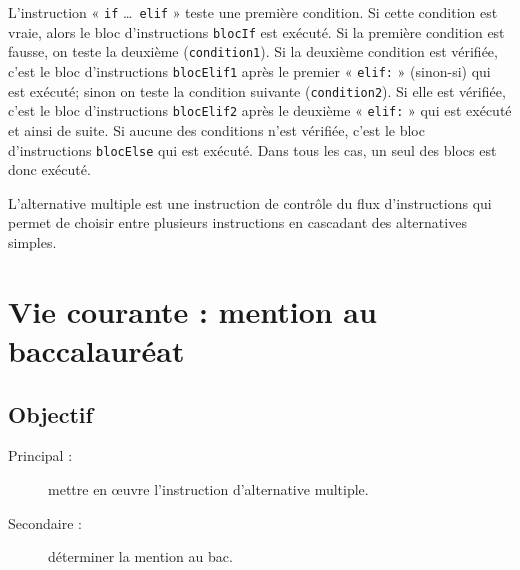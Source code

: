 L'instruction « {\tt if} \ldots\ {\tt elif} » teste une première condition. 
Si cette condition est vraie, alors le bloc d'instructions {\tt blocIf} 
est exécuté. Si la première condition est fausse, on teste la deuxième ({\tt condition1}).
Si la deuxième condition est vérifiée, c'est le bloc d'instructions {\tt blocElif1} après le premier « {\tt elif:} » 
(sinon-si) qui est exécuté; sinon on teste la condition suivante ({\tt condition2}).
Si elle est vérifiée, c'est le bloc d'instructions {\tt blocElif2} après le deuxième « {\tt elif:} » 
qui est exécuté et ainsi de suite. Si aucune des conditions n'est vérifiée, c'est le bloc d'instructions
{\tt blocElse} qui est exécuté. Dans tous les cas, un seul des blocs est donc exécuté.

\begin{definition}
L'alternative multiple est une instruction de contrôle du flux d'instructions 
qui permet de choisir entre plusieurs instructions en cascadant des alternatives simples.
\end{definition}

\section{Vie courante : mention au baccalauréat}\label{tests:vie-courante}

\subsection{Objectif}\label{tests:vie-courante:objectif}
\begin{description}
\item[Principal : ] mettre en \oe uvre l'instruction d'alternative multiple.
\item[Secondaire :] déterminer la mention au bac.
\end{description}

